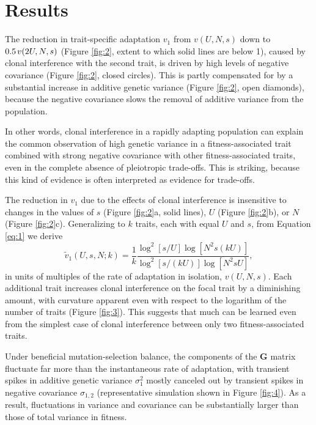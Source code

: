 \documentclass[9pt,twocolumn,twoside]{gsajnl}
\newcommand{\G}{\textbf{G }}
\begin{document}
\section*{Results}
\label{sec:results}

The reduction in trait-specific adaptation $v_1$ from $v(U,N,s)$ down to $0.5 \hspace{.02 in} v(2U,N,s)$ (Figure \ref{fig:2}, extent to which solid lines are below 1), caused by clonal interference with the second trait, is driven by high levels of negative covariance (Figure \ref{fig:2}, closed circles). This is partly compensated for by a substantial increase in additive genetic variance (Figure \ref{fig:2}, open diamonds), because the negative covariance slows the removal of additive variance from the population.

In other words, clonal interference in a rapidly adapting population can explain the common observation of high genetic variance in a fitness-associated trait combined with strong negative covariance with other fitness-associated traits, even in the complete absence of pleiotropic trade-offs. This is striking, because this kind of evidence is often interpreted as evidence for trade-offs. \par



The reduction in $v_1$ due to the effects of clonal interference is insensitive to changes in the values of $s$ (Figure \ref{fig:2}a, solid lines),  $U$ (Figure \ref{fig:2}b), or $N$ (Figure \ref{fig:2}c). Generalizing to $k$ traits, each with equal $U$ and $s$, from Equation \eqref{eq:1}  we derive
\begin{equation}\label{eq:6}
 \tilde{v}_1 (U,s,N;k) 
= \frac{1}{k}\frac{\log^2[s/U]\log[N^2s(kU)]}{\log^2[s/(kU)]\log[N^2sU]},
\end{equation}
in units of multiples of the rate of adaptation in isolation, $v(U,N,s)$. Each additional trait increases clonal interference on the focal trait by a diminishing amount, with curvature apparent even with respect to the logarithm of the number of traits (Figure \ref{fig:3}). This suggests that much can be learned even from the simplest case of clonal interference between only two fitness-associated traits.\par

Under beneficial mutation-selection balance, the components of the \G matrix fluctuate far more than the instantaneous rate of adaptation, with transient spikes in additive genetic variance $\sigma_1^2$ mostly canceled out by transient spikes in negative covariance $\sigma_{1,2}$ (representative simulation shown in Figure \ref{fig:4}). As a result, fluctuations in variance and covariance can be substantially larger than those of total variance in fitness.\par
\end{document}
